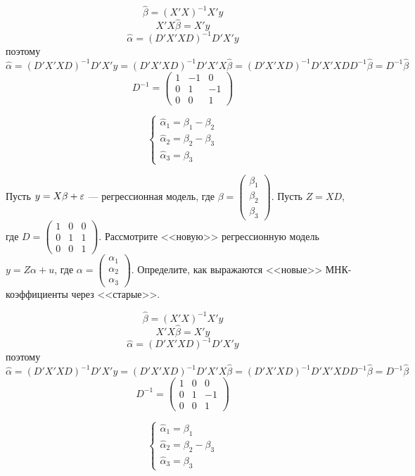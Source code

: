 \begin{solution}
\[\hat\beta=(X'X)^{-1}X'y\]
\[X'X\hat\beta=X'y\]
\[\hat\alpha=(D'X'XD)^{-1}D'X'y\]
поэтому
\[\hat\alpha=(D'X'XD)^{-1}D'X'y=(D'X'XD)^{-1}D'X'X\hat\beta=(D'X'XD)^{-1}D'X'XDD^{-1}\hat\beta=D^{-1}\hat\beta\]
\[D^{-1}=\left(\begin{array}{ccc}
1 & -1 & 0\\ 
0 & 1 & -1\\
0 & 0 & 1
\end{array}\right)\]

\[\begin{cases}
\hat\alpha_1=\beta_1-\beta_2\\
\hat\alpha_2=\beta_2-\beta_3\\
\hat\alpha_3=\beta_3
\end{cases}\]
\end{solution}


\begin{problem}
Пусть $y = X\beta + \varepsilon$ --- регрессионная модель, где $\beta = \begin{pmatrix} \beta_1 \\ \beta_2 \\ \beta_3 \end{pmatrix}$. Пусть $Z = XD$, где $D = \begin{pmatrix} 1 & 0 & 0 \\ 0 & 1 & 1 \\ 0 & 0 & 1 \end{pmatrix}$. Рассмотрите <<новую>> регрессионную модель $y = Z\alpha + u$, где $\alpha = \begin{pmatrix} \alpha_1 \\ \alpha_2 \\ \alpha_3 \end{pmatrix}$. Определите, как выражаются <<новые>> МНК-коэффициенты через <<старые>>.

\end{problem}

\begin{solution}
\[\hat\beta=(X'X)^{-1}X'y\]
\[X'X\hat\beta=X'y\]
\[\hat\alpha=(D'X'XD)^{-1}D'X'y\]
поэтому
\[\hat\alpha=(D'X'XD)^{-1}D'X'y=(D'X'XD)^{-1}D'X'X\hat\beta=(D'X'XD)^{-1}D'X'XDD^{-1}\hat\beta=D^{-1}\hat\beta\]
\[D^{-1}=\left(\begin{array}{ccc}
1 & 0 & 0\\ 
0 & 1 & -1\\
0 & 0 & 1
\end{array}\right)\]

\[\begin{cases}
\hat\alpha_1=\beta_1\\
\hat\alpha_2=\beta_2-\beta_3\\
\hat\alpha_3=\beta_3
\end{cases}\]
\end{solution}


